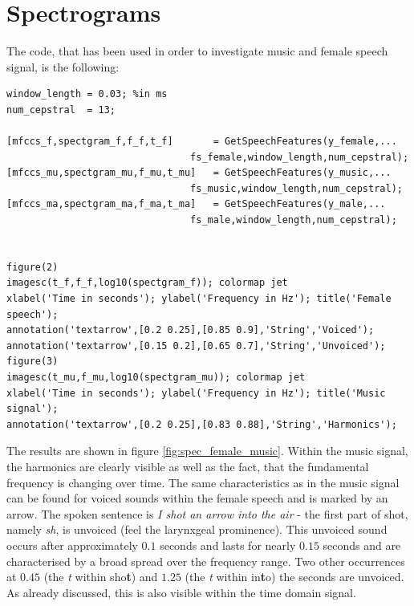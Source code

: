 \section{Spectrograms}
The code, that has been used in order to investigate music and female speech signal, is the following:
\begin{lstlisting}
window_length = 0.03; %in ms
num_cepstral  = 13;

[mfccs_f,spectgram_f,f_f,t_f]       = GetSpeechFeatures(y_female,...
                                fs_female,window_length,num_cepstral);
[mfccs_mu,spectgram_mu,f_mu,t_mu]   = GetSpeechFeatures(y_music,...
                                fs_music,window_length,num_cepstral);
[mfccs_ma,spectgram_ma,f_ma,t_ma]   = GetSpeechFeatures(y_male,...
                                fs_male,window_length,num_cepstral);


figure(2)
imagesc(t_f,f_f,log10(spectgram_f)); colormap jet
xlabel('Time in seconds'); ylabel('Frequency in Hz'); title('Female speech');
annotation('textarrow',[0.2 0.25],[0.85 0.9],'String','Voiced'); 
annotation('textarrow',[0.15 0.2],[0.65 0.7],'String','Unvoiced');
figure(3)
imagesc(t_mu,f_mu,log10(spectgram_mu)); colormap jet
xlabel('Time in seconds'); ylabel('Frequency in Hz'); title('Music signal');
annotation('textarrow',[0.2 0.25],[0.83 0.88],'String','Harmonics');
\end{lstlisting}

The results are shown in figure \ref{fig:spec_female_music}. Within the music signal, the harmonics are clearly visible as well as the fact, that the fundamental frequency is changing over time. The same characteristics as in the music signal can be found for voiced sounds within the female speech and is marked by an arrow. The spoken sentence is \textit{I shot an arrow into the air} - the first part of shot, namely \textit{sh}, is unvoiced (feel the larynxgeal prominence). This unvoiced sound occurs after approximately $0.1$ seconds and lasts for nearly $0.15$ seconds and are characterised by a broad spread over the frequency range. Two other occurrences at $0.45$ (the \textit{t} within sho\textbf{t}) and $1.25$ (the \textit{t} within in\textbf{t}o) the seconds are unvoiced. As already discussed, this is also visible within the time domain signal.


